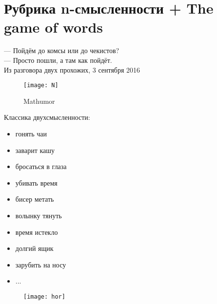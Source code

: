 \section{Рубрика n-смысленности + The game of words}
\begin{epigraph}
        --- Пойдём до комсы или до чекистов?\\
        --- Просто пошли, а там как пойдёт.\\
        Из разговора двух прохожих, 3 сентября 2016
\end{epigraph}

\begin{figure}[ht!]
    \centering
    \texttt{[image: N]}
    \caption{Mathumor}
\end{figure}

Классика двухсмысленности:
\begin{itemize}
    \item гонять чаи
    \item заварит кашу
    \item бросаться в глаза
    \item убивать время
    \item бисер метать
    \item волынку тянуть
    \item время истекло
    \item долгий ящик
    \item зарубить на носу
    \item ...
\end{itemize}

\begin{figure}[ht!]
    \centering
    \texttt{[image: hor]}
\end{figure}

\begin{flushright}
\end{flushright}

